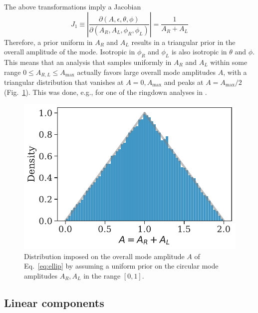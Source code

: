 \documentclass[aps,prd,twocolumn,superscriptaddress,preprintnumbers,floatfix,nofootinbib]{revtex4-2}
\begin{document}
The above transformations imply a Jacobian
\begin{equation}
J_1 \equiv \left| \frac{\partial(A,\epsilon,\theta,\phi)}{\partial(A_R, A_L, \phi_R, \phi_L)}\right| =  \frac{1}{A_R + A_L}
\end{equation}
Therefore, a prior uniform in $A_R$ and $A_L$ results in a triangular prior in the overall amplitude of the mode.
Isotropic in $\phi_R$ and $\phi_L$ is also isotropic in $\theta$ and $\phi$.
This means that an analysis that samples uniformly in $A_R$ and $A_L$ within some range $0 \leq A_{R,L} \leq A_\mathrm{max}$ actually favors large overall mode amplitudes $A$, with a triangular distribution that vanishes at $A=0,A_\mathrm{max}$ and peaks at $A = A_\mathrm{max}/2$ (Fig.~\ref{fig:jac_rl}).
This was done, e.g., for one of the ringdown analyses in \cite{LIGOScientific:2020tif}.

\begin{figure}
\includegraphics[width=\columnwidth]{jac_Aellip_RL}
\caption{Distribution imposed on the overall mode amplitude $A$ of Eq.~\eqref{eq:ellip} by assuming a uniform prior on the circular mode amplitudes $A_R, A_L$ in the range $[0, 1]$.}
\label{fig:jac_rl}
\end{figure}


\subsection{Linear components}
\end{document}
